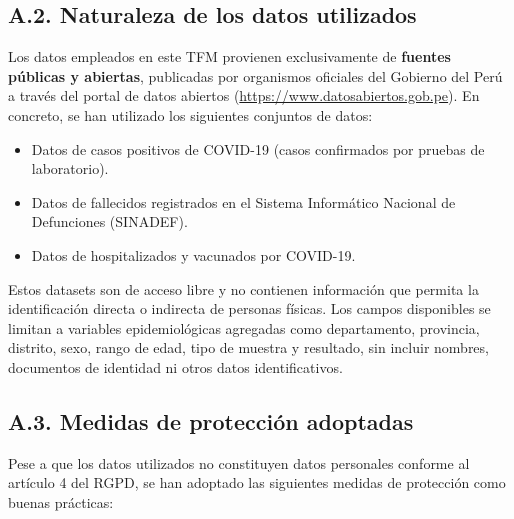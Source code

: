 \documentclass[12pt,a4paper]{article}
\providecommand{\tightlist}{%
  \setlength{\itemsep}{0pt}\setlength{\parskip}{0pt}}
\begin{document}
\subsection*{A.2. Naturaleza de los datos utilizados}

Los datos empleados en este TFM provienen exclusivamente de \textbf{fuentes públicas y abiertas}, publicadas por organismos oficiales del Gobierno del Perú a través del portal de datos abiertos (\url{https://www.datosabiertos.gob.pe}). En concreto, se han utilizado los siguientes conjuntos de datos:

\begin{itemize}
    \tightlist
    \item Datos de casos positivos de COVID-19 (casos confirmados por pruebas de laboratorio).
    \item Datos de fallecidos registrados en el Sistema Informático Nacional de Defunciones (SINADEF).
    \item Datos de hospitalizados y vacunados por COVID-19.
\end{itemize}

Estos datasets son de acceso libre y no contienen información que permita la identificación directa o indirecta de personas físicas. Los campos disponibles se limitan a variables epidemiológicas agregadas como departamento, provincia, distrito, sexo, rango de edad, tipo de muestra y resultado, sin incluir nombres, documentos de identidad ni otros datos identificativos.

\subsection*{A.3. Medidas de protección adoptadas}

Pese a que los datos utilizados no constituyen datos personales conforme al artículo 4 del RGPD, se han adoptado las siguientes medidas de protección como buenas prácticas:
\end{document}
